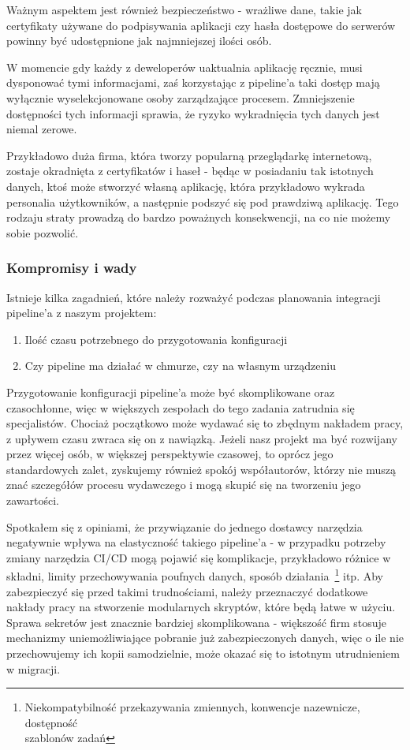 Ważnym aspektem jest również bezpieczeństwo - wrażliwe dane, takie jak certyfikaty używane do podpisywania aplikacji czy
hasła dostępowe do serwerów powinny być udostępnione jak najmniejszej ilości osób.

W momencie gdy każdy z deweloperów uaktualnia aplikację ręcznie, musi dysponować tymi informacjami,
zaś korzystając z pipeline'a taki dostęp mają wyłącznie wyselekcjonowane osoby zarządzające procesem.
Zmniejszenie dostępności tych informacji sprawia, że ryzyko wykradnięcia tych danych jest niemal zerowe.

Przykładowo duża firma, która tworzy popularną przeglądarkę internetową, zostaje okradnięta z certyfikatów i haseł - 
będąc w posiadaniu tak istotnych danych, ktoś może stworzyć własną aplikację, która przykładowo wykrada personalia użytkowników, 
a następnie podszyć się pod prawdziwą aplikację. 
Tego rodzaju straty prowadzą do bardzo poważnych konsekwencji, na co nie możemy sobie pozwolić.

\subsubsection{Kompromisy i wady}
Istnieje kilka zagadnień, które należy rozważyć podczas planowania integracji pipeline'a z naszym projektem:
\begin{enumerate}
    \item Ilość czasu potrzebnego do przygotowania konfiguracji
    \item Czy pipeline ma działać w chmurze, czy na własnym urządzeniu
\end{enumerate}
Przygotowanie konfiguracji pipeline'a może być skomplikowane oraz \\%
czasochłonne, więc w większych zespołach do tego zadania zatrudnia się specjalistów. 
Chociaż początkowo może wydawać się to zbędnym nakładem pracy, z upływem czasu zwraca się on z nawiązką.
Jeżeli nasz projekt ma być rozwijany przez więcej osób, w większej perspektywie czasowej, 
to oprócz jego standardowych zalet, zyskujemy również spokój współautorów, 
którzy nie muszą znać szczegółów procesu wydawczego i mogą skupić się na tworzeniu jego zawartości.

Spotkałem się z opiniami, że przywiązanie do jednego dostawcy narzędzia negatywnie wpływa na elastyczność 
takiego pipeline'a - w przypadku potrzeby zmiany narzędzia CI/CD mogą pojawić się komplikacje, 
przykładowo różnice w składni, limity przechowywania poufnych danych, sposób działania~\footnote[2]{
    Niekompatybilność przekazywania zmiennych, konwencje nazewnicze, dostępność \\%
    szablonów zadań
} itp.
Aby zabezpieczyć się przed takimi trudnościami, należy przeznaczyć dodatkowe nakłady pracy na stworzenie 
modularnych skryptów, które będą łatwe w użyciu.
Sprawa sekretów jest znacznie bardziej skomplikowana - większość firm stosuje mechanizmy uniemożliwiające pobranie już 
zabezpieczonych danych, więc o ile nie przechowujemy ich kopii samodzielnie, może okazać się to istotnym utrudnieniem w migracji.

